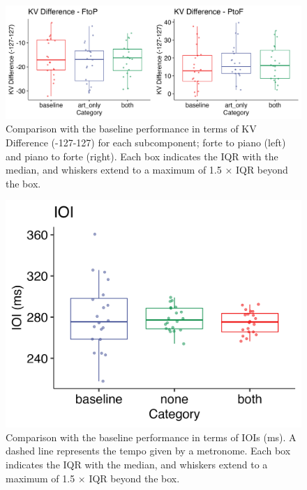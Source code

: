 \documentclass[
  man,floatsintext]{apa6}
\begin{document}
\begin{figure}
\includegraphics[width=1\linewidth]{manuscript_files/figure-latex/plot-vel-diff-2-1} \caption{\label{fig:vel-diff-2}Comparison with the baseline performance in terms of KV Difference (-127-127) for each subcomponent; forte to piano (left) and piano to forte (right). Each box indicates the IQR with the median, and whiskers extend to a maximum of 1.5 × IQR beyond the box.}\label{fig:plot-vel-diff-2}
\end{figure}
\begin{figure}
\includegraphics[width=1\linewidth]{manuscript_files/figure-latex/plot-ioi-2-1} \caption{\label{fig:ioi-2}Comparison with the baseline performance in terms of IOIs (ms). A dashed line represents the tempo given by a metronome. Each box indicates the IQR with the median, and whiskers extend to a maximum of 1.5 × IQR beyond the box.}\label{fig:plot-ioi-2}
\end{figure}
\end{document}
